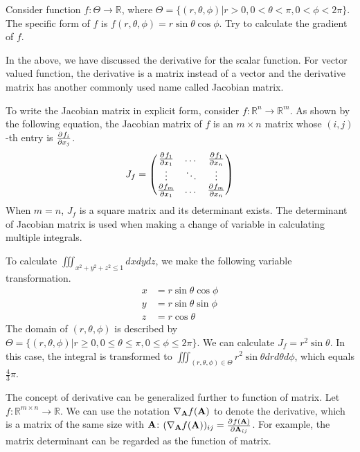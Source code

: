 \begin{exercise}
Consider function $f: \Theta \to \mathbb{R}$, where $\Theta = \{(r, \theta, \phi)| r>0, 0<\theta<\pi, 0<\phi < 2\pi\}$. The specific form of $f$ is $f(r, \theta,\phi) = r \sin \theta \cos\phi$. Try to calculate the gradient of $f$.
\end{exercise}

In the above, we have discussed the derivative for the scalar function. For vector valued function, the derivative is a matrix instead of a vector and the derivative matrix has another commonly used name called Jacobian matrix.

To write the Jacobian matrix in explicit form, consider $f: \mathbb{R}^n \to \mathbb{R}^m$. As shown by the following equation, the Jacobian matrix of $f$ is an $m\times n$ matrix whose $(i,j)$-th entry is $\frac{\partial^{} f_i}{\partial x_j}$.
\begin{equation}
J_f = \begin{pmatrix}
\frac{\partial^{} f_1}{\partial x_1} & \dots & \frac{\partial^{} f_1}{\partial x_n} \\
\vdots & \ddots & \vdots \\
\frac{\partial^{} f_m}{\partial x_1} & \dots & \frac{\partial^{} f_m}{\partial x_n}
\end{pmatrix}
\end{equation}
When $m=n$, $J_f$ is a square matrix and its determinant exists.
The determinant of Jacobian matrix is used when making a change of variable in calculating multiple integrals.
\begin{example}
To calculate	$\iiint_{x^2 + y^2 +z^2 \leq 1} dxdydz$, we make the following variable transformation.
\begin{align*}
x & = r \sin \theta \cos \phi \\
y & = r \sin \theta \sin \phi \\
z & = r \cos \theta
\end{align*}
The domain of $(r, \theta, \phi)$ is described by $\Theta =  \{(r, \theta, \phi)| r \geq 0, 0\leq \theta \leq \pi, 0\leq \phi \leq 2\pi\}$. We can calculate $J_f = r^2 \sin \theta $. In this case, the integral is transformed to $\iiint_{(r, \theta, \phi) \in \Theta} r^2 \sin \theta drd\theta d\phi$, which equals $\frac{4}{3} \pi $.
\end{example}
The concept of derivative can be generalized further to function of matrix. Let $f: \mathbb{R}^{m \times n} \to \mathbb{R}$. We can use the notation $\nabla_{
	\mathbf{A}} f(\mathbf{A}) $ to denote the derivative, which is a matrix of the same size with $\mathbf{A}$:
$(\nabla_{\mathbf{A}} f(\mathbf{A}))_{ij} = \frac{\partial^{} f(\mathbf{A})}{\partial \mathbf{A}_{ij}}$. For example, the matrix determinant can be regarded as the function of matrix.